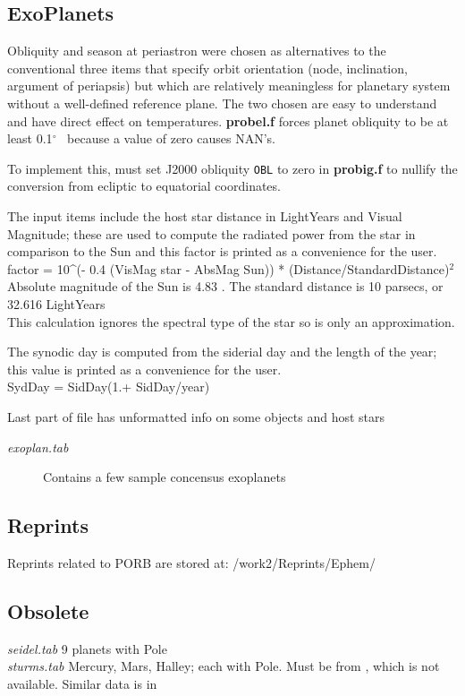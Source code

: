 \documentclass[draft]{article}
\newcommand{\qi}{\\ \hspace*{2.em}}      %
\newcommand{\qd}{$^\circ$}        %
\newcommand{\np}{\textbf}  %
\newcommand{\nf}{\textit}  %
\newcommand{\nv}{\texttt}  %
\begin{document}
\subsection {ExoPlanets}

Obliquity and season at periastron were chosen as alternatives to the
conventional three items that specify orbit orientation (node, inclination,
argument of periapsis) but which are relatively meaningless for planetary system
without a well-defined reference plane.  The two chosen are easy to understand
and have direct effect on temperatures.  \np{probel.f} forces planet obliquity to
be at least 0.1\qd~ because a value of zero causes NAN's.

To implement this, must set J2000 obliquity \nv{OBL} to zero in \np{probig.f} to nullify the conversion from ecliptic to equatorial coordinates. 

The input items include the host star distance in LightYears and Visual Magnitude;  these are used to compute the radiated power from the star in comparison to the Sun and this factor is printed as a convenience for the user.
\\ factor = 10\^{ }(- 0.4 (VisMag star - AbsMag Sun)) * (Distance/StandardDistance)$^2$ 
\qi Absolute magnitude of the Sun is 4.83 . The standard distance is 10 parsecs, or 32.616 LightYears
\\ This calculation ignores the spectral type of the star so is only an approximation.

\vspace{3.mm}
The synodic day is computed from the siderial day and the length of the year; this value is printed as a convenience for the user.
\\ SydDay = SidDay(1.+ SidDay/year)

Last part of file has unformatted info on some objects and host stars

\begin{description} 
 \item [\textit{exoplan.tab}] Contains a few sample concensus exoplanets
\end{description}

\subsection{Reprints}

Reprints related to PORB are stored at: /work2/Reprints/Ephem/

\subsection{Obsolete}
\nf{seidel.tab}    \cite{Seidelmann74} 9 planets with Pole
\\ \nf{sturms.tab} Mercury, Mars, Halley; each with Pole. Must be from \cite{Sturms71}, which is not available. Similar data is in \cite{Melbourne68}
\end{document}
